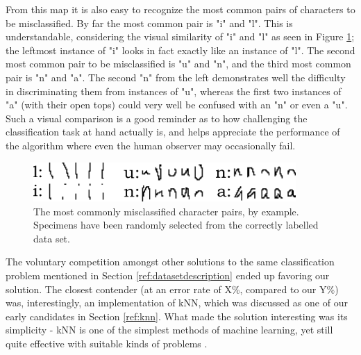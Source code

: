 \documentclass{netsec2012}
\begin{document}

From this map it is also easy to recognize the most common pairs of characters to be misclassified.
By far the most common pair is "i" and "l".
This is understandable, considering the visual similarity of "i" and "l" as seen in Figure
\ref{fig:charpairs}; the leftmost instance of "i" looks in fact exactly like an instance of "l".
The second most common pair to be misclassified is "u" and "n", and the third most common pair is
"n" and "a".  The second "n" from the left demonstrates well the difficulty in discriminating them
from instances of "u", whereas the first two instances of "a" (with their open tops) could very well
be confused with an "n" or even a "u".  Such a visual comparison is a good reminder as to how
challenging the classification task at hand actually is, and helps appreciate the performance of the
algorithm where even the human observer may occasionally fail.

\begin{figure}[t]
\centering
\includegraphics[width=100mm]{pairs.png}
\caption{The most commonly misclassified character pairs, by example.  Specimens have been randomly
selected from the correctly labelled data set.}
\label{fig:charpairs}
\end{figure}

\label{ref:datachallenge}

The voluntary competition amongst other solutions to the same classification problem mentioned in
Section \ref{ref:datasetdescription} ended up favoring our solution.  The closest contender (at an
error rate of X\%, compared to our Y\%) was, interestingly, an implementation of kNN, which was
discussed as one of our early candidates in Section \ref{ref:knn}.  What made the solution
interesting was its simplicity - kNN is one of the simplest methods of machine learning, yet still
quite effective with suitable kinds of problems \cite{keller1985fuzzy}.

%
\end{document}
